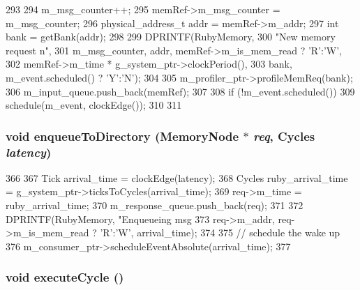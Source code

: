 \begin{DoxyCode}
293 {
294     m_msg_counter++;
295     memRef->m_msg_counter = m_msg_counter;
296     physical_address_t addr = memRef->m_addr;
297     int bank = getBank(addr);
298 
299     DPRINTF(RubyMemory,
300             "New memory request%
      n",
301             m_msg_counter, addr, memRef->m_is_mem_read ? 'R':'W',
302             memRef->m_time * g_system_ptr->clockPeriod(),
303             bank, m_event.scheduled() ? 'Y':'N');
304 
305     m_profiler_ptr->profileMemReq(bank);
306     m_input_queue.push_back(memRef);
307 
308     if (!m_event.scheduled()) {
309         schedule(m_event, clockEdge());
310     }
311 }
\end{DoxyCode}
\hypertarget{classRubyMemoryControl_a5ad0e6ec636d4094ee1b89c121d37dd9}{
\subsubsection[{enqueueToDirectory}]{\setlength{\rightskip}{0pt plus 5cm}void enqueueToDirectory ({\bf MemoryNode} $\ast$ {\em req}, \/  {\bf Cycles} {\em latency})}}
\label{classRubyMemoryControl_a5ad0e6ec636d4094ee1b89c121d37dd9}



\begin{DoxyCode}
366 {
367     Tick arrival_time = clockEdge(latency);
368     Cycles ruby_arrival_time = g_system_ptr->ticksToCycles(arrival_time);
369     req->m_time = ruby_arrival_time;
370     m_response_queue.push_back(req);
371 
372     DPRINTF(RubyMemory, "Enqueueing msg %
373             req->m_addr, req->m_is_mem_read ? 'R':'W', arrival_time);
374 
375     // schedule the wake up
376     m_consumer_ptr->scheduleEventAbsolute(arrival_time);
377 }
\end{DoxyCode}
\hypertarget{classRubyMemoryControl_ac776b02b70a3c6795e0823d77bf74c73}{
\subsubsection[{executeCycle}]{\setlength{\rightskip}{0pt plus 5cm}void executeCycle ()}}
\label{classRubyMemoryControl_ac776b02b70a3c6795e0823d77bf74c73}



